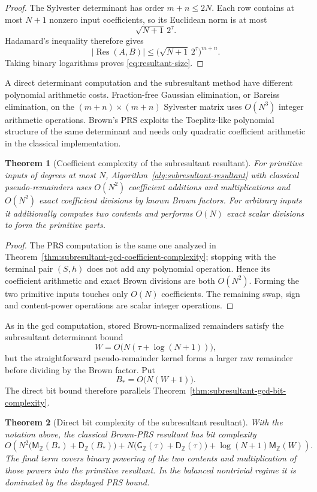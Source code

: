 \documentclass[11pt]{book}
\newtheorem{theorem}{Theorem}[section]
\theoremstyle{definition}
\newcommand{\ZZ}{\mathbb Z}
\newcommand{\MZ}{\mathsf M_{\ZZ}}
\begin{document}
\begin{proof}
The Sylvester determinant has order $m+n\le2N$.  Each row contains at most
$N+1$ nonzero input coefficients, so its Euclidean norm is at most
\[
 \sqrt{N+1}\,2^\tau.
\]
Hadamard's inequality therefore gives
\[
 |\operatorname{Res}(A,B)|
 \le
 \bigl(\sqrt{N+1}\,2^\tau\bigr)^{m+n}.
\]
Taking binary logarithms proves \eqref{eq:resultant-size}.
\end{proof}

A direct determinant computation and the subresultant method have different
polynomial arithmetic costs.  Fraction-free Gaussian elimination, or Bareiss
elimination, on the $(m+n)\times(m+n)$ Sylvester matrix uses
$O(N^3)$ integer arithmetic operations.  Brown's PRS exploits the Toeplitz-like
polynomial structure of the same determinant and needs only quadratic
coefficient arithmetic in the classical implementation.

\begin{theorem}[Coefficient complexity of the subresultant resultant]
\label{thm:resultant-coefficient-complexity}
For primitive inputs of degrees at most $N$, Algorithm~\ref{alg:subresultant-resultant}
with classical pseudo-remainders uses $O(N^2)$ coefficient additions and
multiplications and $O(N^2)$ exact coefficient divisions by known Brown
factors.  For arbitrary inputs it additionally computes two contents and
performs $O(N)$ exact scalar divisions to form the primitive parts.
\end{theorem}

\begin{proof}
The PRS computation is the same one analyzed in
Theorem~\ref{thm:subresultant-gcd-coefficient-complexity}; stopping with the
terminal pair $(S,h)$ does not add any polynomial operation.  Hence its
coefficient arithmetic and exact Brown divisions are both $O(N^2)$.  Forming
the two primitive inputs touches only $O(N)$ coefficients.  The remaining
swap, sign and content-power operations are scalar integer operations.
\end{proof}

As in the gcd computation, stored Brown-normalized remainders satisfy the
subresultant determinant bound
\[
 W=O\bigl(N(\tau+\log(N+1))\bigr),
\]
but the straightforward pseudo-remainder kernel forms a larger raw remainder
before dividing by the Brown factor.  Put
\[
 B_*=O\bigl(N(W+1)\bigr).
\]
The direct bit bound therefore parallels
Theorem~\ref{thm:subresultant-gcd-bit-complexity}.

\begin{theorem}[Direct bit complexity of the subresultant resultant]
\label{thm:resultant-bit-complexity}
With the notation above, the classical Brown-PRS resultant has bit complexity
\begin{equation}\label{eq:resultant-bit-complexity}
 O\!\left(
 N^2\bigl(\MZ(B_*)+\mathsf D_{\ZZ}(B_*)\bigr)
 +N\bigl(\mathsf G_{\ZZ}(\tau)+\mathsf D_{\ZZ}(\tau)\bigr)
 +\log(N+1)\MZ(W)
 \right).
\end{equation}
The final term covers binary powering of the two contents and multiplication
of those powers into the primitive resultant.  In the balanced nontrivial
regime it is dominated by the displayed PRS bound.
\end{theorem}
\end{document}
